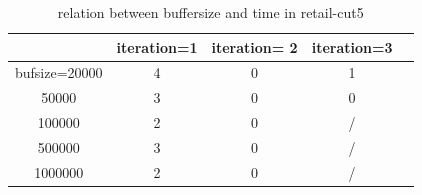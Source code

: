 \documentclass{article}
\begin{document}
\begin{table}
\begin{tabular}{|c|c|c|c|c|}
  \hline
   &iteration=1 &iteration= 2 & iteration=3  \\\hline
  bufsize=20000 & 4 & 0 & 1  \\\hline
  50000 & 3 & 0 & 0  \\\hline
  100000 & 2 & 0 & /  \\\hline
  500000 & 3 & 0 & /  \\\hline
  1000000 & 2 & 0 & / \\
  \hline
  \end{tabular}
  \caption{relation between buffersize and time in retail-cut5}
\end{table}
\end{document}
